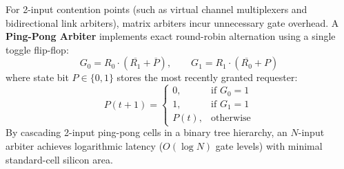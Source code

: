 For 2-input contention points (such as virtual channel multiplexers and bidirectional link arbiters), matrix arbiters incur unnecessary gate overhead. A \textbf{Ping-Pong Arbiter} implements exact round-robin alternation using a single toggle flip-flop:
\begin{equation}
G_0 = R_0 \cdot (\overline{R_1} + \overline{P}), \qquad G_1 = R_1 \cdot (\overline{R_0} + P)
\label{eq:ch3_pingpong_logic}
\end{equation}
where state bit $P \in \{0, 1\}$ stores the most recently granted requester:
\begin{equation}
P(t+1) = \begin{cases} 0, & \text{if } G_0 = 1 \\ 1, & \text{if } G_1 = 1 \\ P(t), & \text{otherwise} \end{cases}
\end{equation}
By cascading 2-input ping-pong cells in a binary tree hierarchy, an $N$-input arbiter achieves logarithmic latency ($O(\log N)$ gate levels) with minimal standard-cell silicon area.

